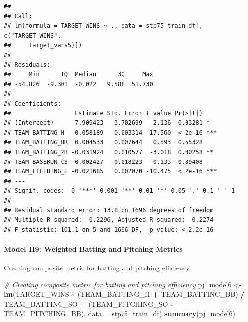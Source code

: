 \documentclass[
]{article}
\newenvironment{Shaded}{\begin{snugshade}}{\end{snugshade}}
\newcommand{\AttributeTok}[1]{\textcolor[rgb]{0.13,0.29,0.53}{#1}}
\newcommand{\CommentTok}[1]{\textcolor[rgb]{0.56,0.35,0.01}{\textit{#1}}}
\newcommand{\FunctionTok}[1]{\textcolor[rgb]{0.13,0.29,0.53}{\textbf{#1}}}
\newcommand{\NormalTok}[1]{#1}
\newcommand{\OtherTok}[1]{\textcolor[rgb]{0.56,0.35,0.01}{#1}}
\newcommand{\SpecialCharTok}[1]{\textcolor[rgb]{0.81,0.36,0.00}{\textbf{#1}}}
\begin{document}
\begin{verbatim}
## 
## Call:
## lm(formula = TARGET_WINS ~ ., data = stp75_train_df[, c("TARGET_WINS", 
##     target_vars5)])
## 
## Residuals:
##     Min      1Q  Median      3Q     Max 
## -54.826  -9.301  -0.022   9.588  51.730 
## 
## Coefficients:
##                  Estimate Std. Error t value Pr(>|t|)    
## (Intercept)      7.909423   3.702699   2.136  0.03281 *  
## TEAM_BATTING_H   0.058189   0.003314  17.560  < 2e-16 ***
## TEAM_BATTING_HR  0.004533   0.007644   0.593  0.55328    
## TEAM_BATTING_2B -0.031924   0.010577  -3.018  0.00258 ** 
## TEAM_BASERUN_CS -0.002427   0.018223  -0.133  0.89408    
## TEAM_FIELDING_E -0.021685   0.002070 -10.475  < 2e-16 ***
## ---
## Signif. codes:  0 '***' 0.001 '**' 0.01 '*' 0.05 '.' 0.1 ' ' 1
## 
## Residual standard error: 13.8 on 1696 degrees of freedom
## Multiple R-squared:  0.2296, Adjusted R-squared:  0.2274 
## F-statistic: 101.1 on 5 and 1696 DF,  p-value: < 2.2e-16
\end{verbatim}

\paragraph{Model H9: Weighted Batting and Pitching
Metrics}\label{model-h9-weighted-batting-and-pitching-metrics}

Creating composite metric for batting and pitching efficiency

\begin{Shaded}
\begin{Highlighting}[]
\CommentTok{\# Creating composite metric for batting and pitching efficiency}
\NormalTok{pj\_model6 }\OtherTok{\textless{}{-}} \FunctionTok{lm}\NormalTok{(TARGET\_WINS }\SpecialCharTok{\textasciitilde{}}\NormalTok{ (TEAM\_BATTING\_H }\SpecialCharTok{+}\NormalTok{ TEAM\_BATTING\_BB) }\SpecialCharTok{/}\NormalTok{ TEAM\_BATTING\_SO }\SpecialCharTok{+}\NormalTok{ (TEAM\_PITCHING\_SO }\SpecialCharTok{{-}}\NormalTok{ TEAM\_PITCHING\_BB), }\AttributeTok{data =}\NormalTok{ stp75\_train\_df)}
\FunctionTok{summary}\NormalTok{(pj\_model6)}
\end{Highlighting}
\end{Shaded}
\end{document}
